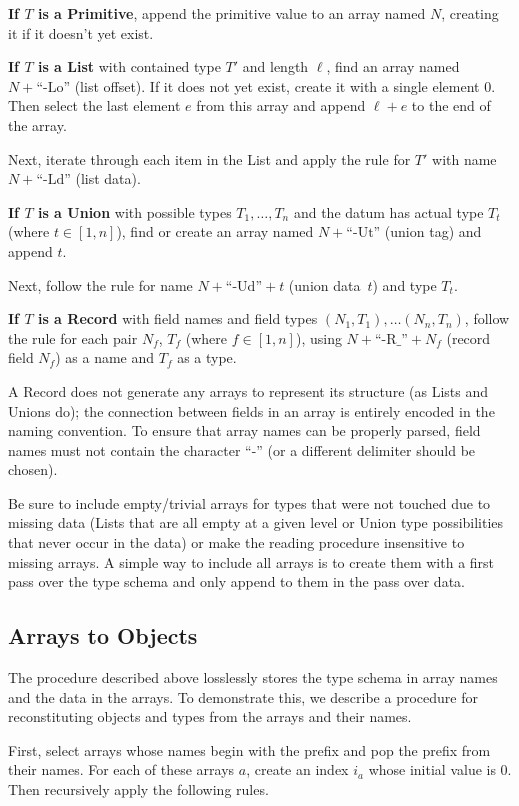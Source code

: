 \documentclass[10pt, conference, compsocconf]{IEEEtran}
\begin{document}
{\bf If $T$ is a Primitive}, append the primitive value to an array named $N$, creating it if it doesn't yet exist.

{\bf If $T$ is a List} with contained type $T'$ and length $\ell$, find an array named $N + \mbox{``-Lo''}$ (list offset). If it does not yet exist, create it with a single element $0$. Then select the last element $e$ from this array and append $\ell + e$ to the end of the array.

Next, iterate through each item in the List and apply the rule for $T'$ with name $N + \mbox{``-Ld''}$ (list data).

{\bf If $T$ is a Union} with possible types $T_1, \ldots, T_n$ and the datum has actual type $T_t$ (where $t \in [1, n]$), find or create an array named $N + \mbox{``-Ut''}$ (union tag) and append $t$.

Next, follow the rule for name $N + \mbox{``-Ud''} + t$ (union data~$t$) and type $T_t$.

{\bf If $T$ is a Record} with field names and field types $(N_1, T_1), \ldots (N_n, T_n)$, follow the rule for each pair $N_f$, $T_f$ (where $f \in [1, n]$), using $N + \mbox{``-R\_''} + N_f$ (record field $N_f$) as a name and $T_f$ as a type.

A Record does not generate any arrays to represent its structure (as Lists and Unions do); the connection between fields in an array is entirely encoded in the naming convention. To ensure that array names can be properly parsed, field names must not contain the character ``-'' (or a different delimiter should be chosen).

Be sure to include empty/trivial arrays for types that were not touched due to missing data (Lists that are all empty at a given level or Union type possibilities that never occur in the data) or make the reading procedure insensitive to missing arrays. A simple way to include all arrays is to create them with a first pass over the type schema and only append to them in the pass over data.

\subsection{Arrays to Objects}

The procedure described above losslessly stores the type schema in array names and the data in the arrays. To demonstrate this, we describe a procedure for reconstituting objects and types from the arrays and their names.

First, select arrays whose names begin with the prefix and pop the prefix from their names. For each of these arrays $a$, create an index $i_a$ whose initial value is 0. Then recursively apply the following rules.
\end{document}
